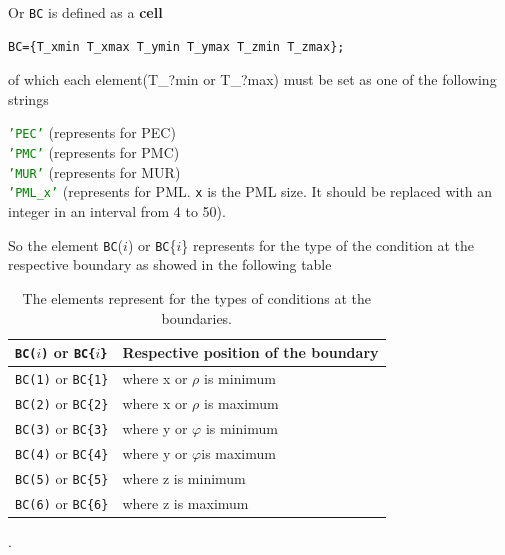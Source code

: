 \begin{myindentpar}
          Or \texttt{BC} is defined as a \textbf{cell} 
	  \begin{myindentpar}
	  \begin{lstlisting}[caption={\texttt{BC} in the form of a cell},label=BCincell]
 BC={T_xmin T_xmax T_ymin T_ymax T_zmin T_zmax};
	  \end{lstlisting}
	  of which   each  element(T\_?min or T\_?max)  must be set as one of the following strings 
	  \begin{myindentpar}
	     \textcolor{green}{\texttt{'PEC'}} \qquad   (represents for PEC)\\
	     \textcolor{green}{\texttt{'PMC'}} \qquad   (represents for PMC)\\
	     \textcolor{green}{\texttt{'MUR'}}  \qquad  (represents for MUR)\\
	     \textcolor{green}{\texttt{'PML\_x'}} \qquad   (represents for PML. \texttt{x} is  the PML size. It should be replaced with an integer in an interval from 4 to 50).
	  \end{myindentpar}	
	\end{myindentpar}	
	  So the element \texttt{BC}($i$) or \texttt{BC}\{$i$\} represents for the type of the  condition at the respective boundary as showed in the following table
	  \begin{table}[htb]\centering
	  \begin{tabular}{l|l}
	  \texttt{BC($i$)} or \texttt{BC\{$i$\}} & Respective position of the boundary\\ \hline
		 \texttt{BC(1)} or  \texttt{BC\{1\}} & where x or $\rho$ is minimum\\
		 \texttt{BC(2)} or  \texttt{BC\{2\}}& where x or $\rho$ is maximum\\
		 \texttt{BC(3)} or  \texttt{BC\{3\}}& where y or $\varphi$ is minimum\\
		 \texttt{BC(4)} or  \texttt{BC\{4\}}& where y or $\varphi$is maximum\\
		 \texttt{BC(5)} or  \texttt{BC\{5\}}& where z is minimum\\
		 \texttt{BC(6)} or  \texttt{BC\{6\}}& where z is maximum
	  \end{tabular}\caption{The elements represent for the types of conditions at the boundaries.}
	  \end{table}
	  \label{Elements of BC and the rescpective boundaries}.
         \end{myindentpar}
